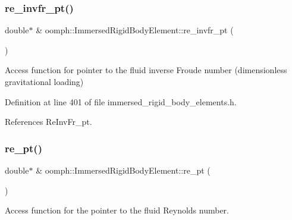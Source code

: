 \mbox{\label{classoomph_1_1ImmersedRigidBodyElement_ad31c52b0920a18e69a71577ad5aad277}} 
\subsubsection{\texorpdfstring{re\+\_\+invfr\+\_\+pt()}{re\_invfr\_pt()}}
{\footnotesize\ttfamily double$\ast$ \& oomph\+::\+Immersed\+Rigid\+Body\+Element\+::re\+\_\+invfr\+\_\+pt (\begin{DoxyParamCaption}{ }\end{DoxyParamCaption})\hspace{0.3cm}{\ttfamily [inline]}}



Access function for pointer to the fluid inverse Froude number (dimensionless gravitational loading) 



Definition at line 401 of file immersed\+\_\+rigid\+\_\+body\+\_\+elements.\+h.



References Re\+Inv\+Fr\+\_\+pt.

\mbox{\label{classoomph_1_1ImmersedRigidBodyElement_a7e8d88cc4b96a47fbe48a627ec9204c9}} 
\subsubsection{\texorpdfstring{re\+\_\+pt()}{re\_pt()}}
{\footnotesize\ttfamily double$\ast$ \& oomph\+::\+Immersed\+Rigid\+Body\+Element\+::re\+\_\+pt (\begin{DoxyParamCaption}{ }\end{DoxyParamCaption})\hspace{0.3cm}{\ttfamily [inline]}}



Access function for the pointer to the fluid Reynolds number. 



